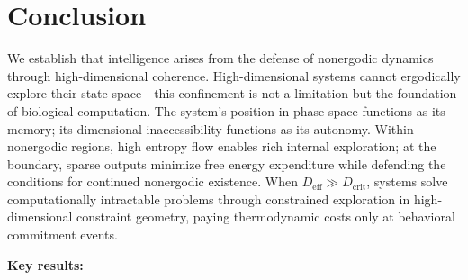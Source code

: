 \documentclass[12pt]{article}
\begin{document}
\section{Conclusion}

We establish that intelligence arises from the defense of nonergodic dynamics through high-dimensional coherence. High-dimensional systems cannot ergodically explore their state space---this confinement is not a limitation but the foundation of biological computation. The system's position in phase space functions as its memory; its dimensional inaccessibility functions as its autonomy. Within nonergodic regions, high entropy flow enables rich internal exploration; at the boundary, sparse outputs minimize free energy expenditure while defending the conditions for continued nonergodic existence. When $D_{\text{eff}} \gg D_{\text{crit}}$, systems solve computationally intractable problems through constrained exploration in high-dimensional constraint geometry, paying thermodynamic costs only at behavioral commitment events.

\textbf{Key results:}
\end{document}
